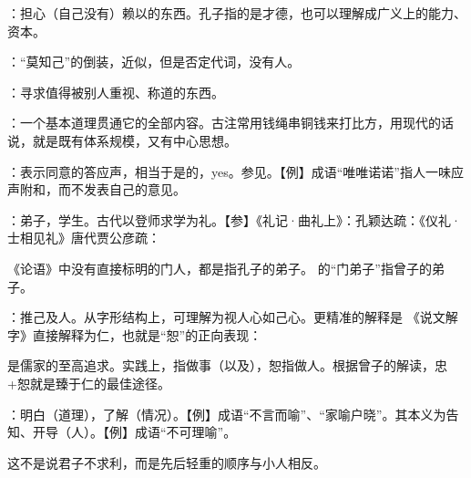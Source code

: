 {
\item {}：担心（自己没有）赖以的东西。孔子指的是才德，也可以理解成广义上的能力、资本。
\item {}：“莫知己”的倒装，近似，但是否定代词，没有人。
\item {}：寻求值得被别人重视、称道的东西。
}
{}


{
\begin{lyitemize}
\item {}：一个基本道理贯通它的全部内容。古注常用钱绳串铜钱来打比方，用现代的话说，就是既有体系规模，又有中心思想。
\item {}：表示同意的答应声，相当于是的，yes。参见。【例】成语“唯唯诺诺”指人一味应声附和，而不发表自己的意见。
\item {}：弟子，学生。古代以登师求学为礼。【参】《礼记·曲礼上》：孔颖达疏：《仪礼·士相见礼》唐代贾公彦疏：

《论语》中没有直接标明的门人，都是指孔子的弟子。 的“门弟子”指曾子的弟子。
\item {}：推己及人。从字形结构上，可理解为视人心如己心。更精准的解释是  《说文解字》直接解释为仁，也就是“恕”的正向表现： 
\end{lyitemize}
是儒家的至高追求。实践上，指做事（以及），恕指做人。根据曾子的解读，忠+恕就是臻于仁的最佳途径。
}
{
} %


{
\item {}：明白（道理），了解（情况）。【例】成语“不言而喻”、“家喻户晓”。其本义为告知、开导（人）。【例】成语“不可理喻”。

这不是说君子不求利，而是先后轻重的顺序与小人相反。
}
{}


